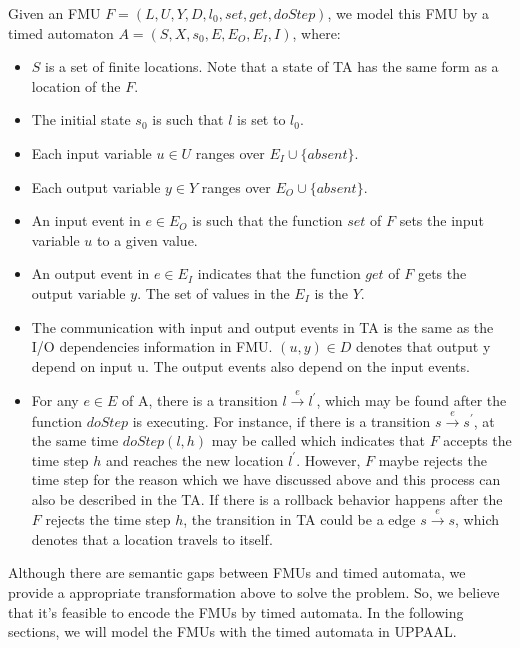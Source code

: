 Given an FMU $F=(L,U,Y,D,l_{0},set,get,doStep)$, we model this FMU by a timed automaton $A = (S,X,s_{0},E,E_{O},E_{I},I)$, where:
\begin{itemize}
\item
$S$ is a set of finite locations. Note that a state of TA has the same form as a location of the $F$.
\item
The initial state $s_{0}$ is such that $l$ is set to $l_{0}$. 
\item
Each input variable $u \in U$ ranges over $E_{I} \cup \{absent\}$.
\item
Each output variable $y \in Y$ ranges over $E_{O} \cup \{absent\}$.
\item
An input event in $e \in E_{O}$ is such that the function $set$ of $F$ sets the input variable $u$ to a given value. 
\item
An output event in $e \in E_{I}$ indicates that the function $get$ of $F$ gets the output variable $y$. The set of values in the $E_{I}$ is the $Y$.  
\item
The communication with input and output events in TA is the same as the I/O dependencies information in FMU. $(u,y) \in D$ denotes that output y depend on input u. The output events also depend on the input events.
\item
For any $e \in E$ of A, there is a transition $l \xrightarrow{e} l^{\prime}$, which may be found after the function $doStep$ is executing. For instance, if there is a transition $s \xrightarrow{e} s^{\prime}$, at the same time $doStep(l,h)$ may be called which indicates that $F$ accepts the time step $h$ and reaches the new location $l^{\prime}$. However, $F$ maybe rejects the time step for the reason which we have discussed above and this process can also be described in the TA. If there is a rollback behavior happens after the $F$ rejects the time step $h$, the transition in TA could be a edge $s \xrightarrow{e} s$, which denotes that a location travels to itself.
\end{itemize}

%
Although there are semantic gaps between FMUs and timed automata, we provide a  appropriate transformation above to solve the problem. So, we believe that it's feasible to encode the FMUs by timed automata. In the following sections, we will model the FMUs with the timed automata in UPPAAL.


